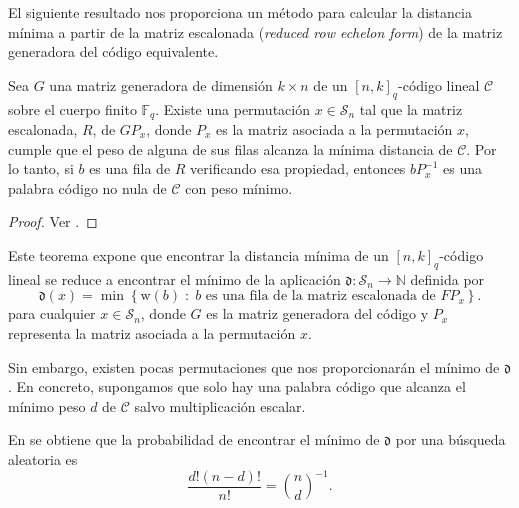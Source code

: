 El siguiente resultado nos proporciona un método para calcular la distancia mínima a partir de la matriz escalonada (\emph{reduced row echelon form}) de la matriz generadora del código equivalente.

\begin{theorem}
    Sea $G$ una matriz generadora de dimensión $k \times n$ de un $[n, k]_q$-código lineal $\mathcal{C}$ sobre el cuerpo finito $\mathbb{F}_q$. Existe una permutación $x \in \mathcal{S}_n$ tal que la matriz escalonada, $R$, de $GP_x$, donde $P_x$ es la matriz asociada a la permutación $x$, cumple que el peso de alguna de sus filas alcanza la mínima distancia de $\mathcal{C}$. Por lo tanto, si $b$ es una fila de $R$ verificando esa propiedad, entonces $bP_x^{-1}$ es una palabra código no nula de $\mathcal{C}$ con peso mínimo.
\end{theorem}

\begin{proof}
    Ver \cite[Página 4]{Cuellar_etal}.
\end{proof}

Este teorema expone que encontrar la distancia mínima de un $[n, k]_q$-código lineal se reduce a encontrar el mínimo de la aplicación $\mathfrak d : \mathcal{S}_n \rightarrow \mathbb{N}$ definida por
\[
    \mathfrak d (x) = \min \left\{ \text{w}(b) \; : \; b \text{ es una fila de la matriz escalonada de } FP_x \right\}.
\]
para cualquier $x \in \mathcal{S}_n$, donde $G$ es la matriz generadora del código y $P_x$ representa la matriz asociada a la permutación $x$.

Sin embargo, existen pocas permutaciones que nos proporcionarán el mínimo de $\mathfrak{d}$. En concreto, supongamos que solo hay una palabra código que alcanza el mínimo peso $d$ de $\mathcal{C}$ salvo multiplicación escalar.

En \cite{Cuellar_etal} se obtiene que la probabilidad de encontrar el mínimo de $\mathfrak{d}$ por una búsqueda aleatoria es
\[
    \frac{d! (n-d)!}{n!} = {n \choose d}^{-1}.
\]

